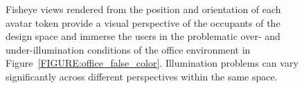\documentclass[10pt,twocolumn,letterpaper]{article}
\begin{document}
\begin{figure}[t]
\caption{Fisheye views rendered from the position and orientation of
  each avatar token provide a visual perspective of the occupants of the design space
and immerse the users in the problematic over- and under-illumination conditions 
  of the office environment
in Figure~\ref{FIGURE:office_false_color}.  Illumination problems can
  vary significantly across different perspectives within the same
  space.}
\vspace{-0.15in}
\label{FIGURE:fisheyes}
\end{figure}
\end{document}
